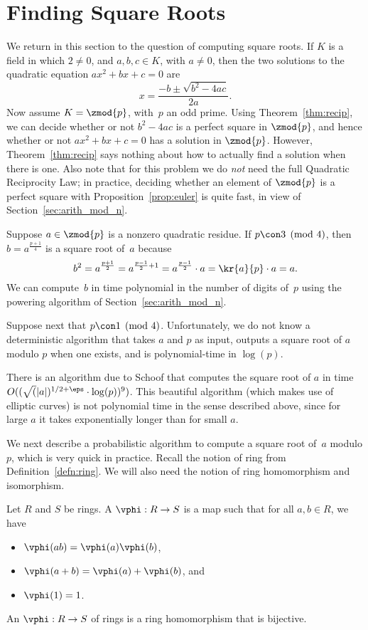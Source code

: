\section{Finding Square Roots}\label{sec:findingsqrt}
We return in this section to the question of computing square roots.
If $K$ is a field in which $2\neq 0$, and $a,b,c\in K$, with $a\neq 0$,
then
the two solutions to the quadratic equation $ax^2+bx+c=0$ are
$$
x = \frac{-b\pm \sqrt{b^2-4ac}}{2a}.
$$
Now assume $K=\zmod{p}$, with~$p$ an odd prime.  Using
Theorem~\ref{thm:recip}, we can decide whether or not $b^2-4ac$ is a
perfect square in $\zmod{p}$, and hence whether or not $ax^2 + bx+c=0$
has a solution in $\zmod{p}$.  However,
Theorem~\ref{thm:recip} says nothing about how to actually find
a solution when there is one.
Also note that for this problem we do {\em not} need the
full Quadratic Reciprocity Law; in practice,
deciding whether an element of $\zmod{p}$ is
a perfect square with Proposition~\ref{prop:euler} is quite fast,
in view of Section~\ref{sec:arith_mod_n}.

Suppose $a\in \zmod{p}$ is a nonzero quadratic residue.
If $p\con 3 \pmod{4}$, then $b=a^{\frac{p+1}{4}}$
is a square root of~$a$ because
$$
  b^2 = a^{\frac{p+1}{2}} = a^{\frac{p-1}{2} + 1}
     = a^{\frac{p-1}{2}} \cdot a
          = \kr{a}{p} \cdot a = a.
$$
We can compute~$b$ in time polynomial in the number of digits of~$p$
using the powering algorithm of Section~\ref{sec:arith_mod_n}.


Suppose next that $p\con 1\pmod{4}$.
Unfortunately, we do not know a deterministic algorithm
that takes $a$ and $p$ as input, outputs
a square root of $a$ modulo $p$ when one exists,
and is polynomial-time in $\log(p)$.

\begin{remark}
  There is an algorithm due to Schoof \cite{schoof:sqrt} that computes
  the square root of $a$ in time $O((\sqrt(|a|)^{1/2 + \eps} \cdot
  \log(p))^9)$.  This beautiful algorithm (which makes use of elliptic
  curves) is not polynomial time in the sense described above, since
  for large $a$ it takes exponentially longer than for small $a$.
\end{remark}

We next describe a probabilistic algorithm to
compute a square root of~$a$ modulo $p$, which is very quick
in practice.
Recall the notion of ring from Definition~\ref{defn:ring}.
We will also need the notion of ring homomorphism and isomorphism.
\begin{definition}
Let $R$ and $S$ be rings.
A  $\vphi:R\to S$
is a map such that for all $a,b\in R$, we have
\begin{itemize}
\item $\vphi(ab) =\vphi(a)\vphi(b)$,
\item $\vphi(a+b) = \vphi(a) + \vphi(b)$, and
\item $\vphi(1) = 1$.
\end{itemize}
An  $\vphi:R\to S$ of rings is a
ring homomorphism that is bijective.
\end{definition}

